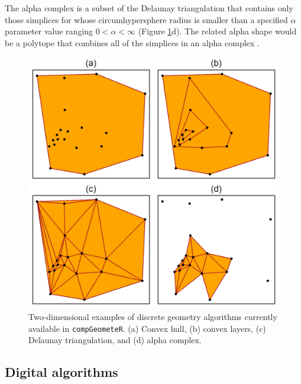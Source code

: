 \documentclass[12pt, a4paper]{article}
\begin{document}
The alpha complex \citep{edelsbrunner-1994} is a subset of the Delaunay triangulation that contains only those simplices for whose circumhypersphere radius is smaller than a specified $\alpha$ parameter value ranging $0 < \alpha < \infty$ (Figure \ref{fig:discrete-algorithms}d).  The related alpha shape would be a polytope that combines all of the simplices in an alpha complex \citep{edelsbrunner-1994}.

\begin{figure}[ht]
\centering
\includegraphics{figures/discrete-algorithms/discrete-algorithms.png}
\caption{Two-dimensional examples of discrete geometry algorithms currently available in \texttt{compGeometeR}. (a) Convex hull, (b) convex layers, (c) Delaunay triangulation, and (d) alpha complex.}
\label{fig:discrete-algorithms}
\end{figure}

\subsection{Digital algorithms}
\end{document}
